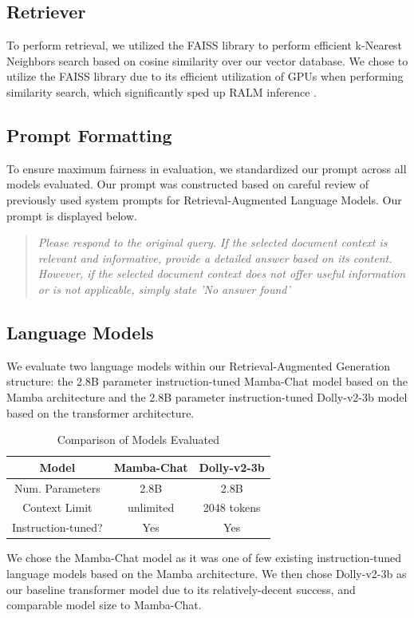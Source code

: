 \documentclass[11pt]{article}
\begin{document}
\subsection{Retriever}
To perform retrieval, we utilized the FAISS library to perform efficient k-Nearest Neighbors search based on cosine similarity over our vector database. We chose to utilize the FAISS library due to its efficient utilization of GPUs when performing similarity search, which significantly sped up RALM inference \cite{johnson2017billionscale}.
\subsection{Prompt Formatting}
To ensure maximum fairness in evaluation, we standardized our prompt across all models evaluated. Our prompt was constructed based on careful review of previously used system prompts for Retrieval-Augmented Language Models.
\newline
\newline
Our prompt is displayed below.
\begin{quote}
    \textit{Please respond to the original query. If the selected document context is relevant and informative, provide a detailed answer based on its content. However, if the selected document context does not offer useful information or is not applicable, simply state 'No answer found'}
\end{quote}
\subsection{Language Models}
We evaluate two language models within our Retrieval-Augmented Generation structure: the 2.8B parameter instruction-tuned Mamba-Chat model based on the Mamba architecture and the 2.8B parameter instruction-tuned Dolly-v2-3b model based on the transformer architecture.
\begin{table}[h]
    \centering
    \begin{tabular}{|c|c|c|} 
     \hline
     \textbf{Model} & Mamba-Chat & Dolly-v2-3b \\
     \hline\hline
     Num. Parameters & 2.8B & 2.8B \\ 
     \hline
     Context Limit & unlimited & 2048 tokens \\
     \hline
     Instruction-tuned? & Yes & Yes \\
     \hline
    \end{tabular}
    \caption{Comparison of Models Evaluated}
    \label{tab:my_label}
\end{table}
\newline
\newline
\newline
We chose the Mamba-Chat model as it was one of few existing instruction-tuned language models based on the Mamba architecture. We then chose Dolly-v2-3b as our baseline transformer model due to its relatively-decent success, and comparable model size to Mamba-Chat. 
\end{document}
